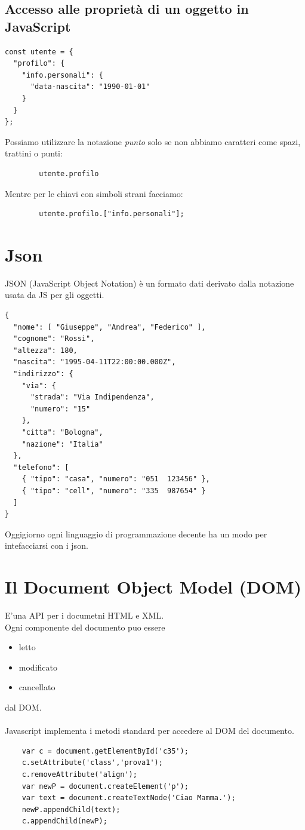 \documentclass[a4paper,12pt]{article}
\begin{document}
\subsection{Accesso alle proprietà di un oggetto in JavaScript}
\begin{lstlisting}
const utente = {
  "profilo": {
    "info.personali": {
      "data-nascita": "1990-01-01"
    }
  }
};
\end{lstlisting}
Possiamo utilizzare la notazione \textit{punto} solo se non abbiamo caratteri come spazi, trattini o punti:
\begin{center}
    \begin{lstlisting}
        utente.profilo
    \end{lstlisting}
\end{center}
Mentre per le chiavi con simboli strani facciamo:
\begin{center}
    \begin{lstlisting}
        utente.profilo.["info.personali"];
    \end{lstlisting}
\end{center}
\section{Json}
JSON (JavaScript Object Notation) è un formato dati derivato dalla notazione usata da JS per gli oggetti.
\begin{lstlisting}
{
  "nome": [ "Giuseppe", "Andrea", "Federico" ],
  "cognome": "Rossi",
  "altezza": 180,
  "nascita": "1995-04-11T22:00:00.000Z",
  "indirizzo": {
    "via": {
      "strada": "Via Indipendenza",
      "numero": "15"
    },
    "citta": "Bologna",
    "nazione": "Italia"
  },
  "telefono": [
    { "tipo": "casa", "numero": "051  123456" },
    { "tipo": "cell", "numero": "335  987654" }
  ]
}
\end{lstlisting}
Oggigiorno ogni linguaggio di programmazione decente ha un modo per intefacciarsi con i json.
\section{Il Document Object Model (DOM)}
E'una API per i documetni HTML e XML. \\
Ogni componente del documento puo essere
\begin{itemize}
    \item letto
    \item modificato
    \item cancellato
\end{itemize}
dal DOM. \\
\vspace{5px}\\
Javascript implementa i metodi standard per accedere al DOM del documento.
\begin{lstlisting}
    var c = document.getElementById('c35');
    c.setAttribute('class','prova1');
    c.removeAttribute('align');
    var newP = document.createElement('p');
    var text = document.createTextNode('Ciao Mamma.');
    newP.appendChild(text);
    c.appendChild(newP);
\end{lstlisting}
\end{document}
